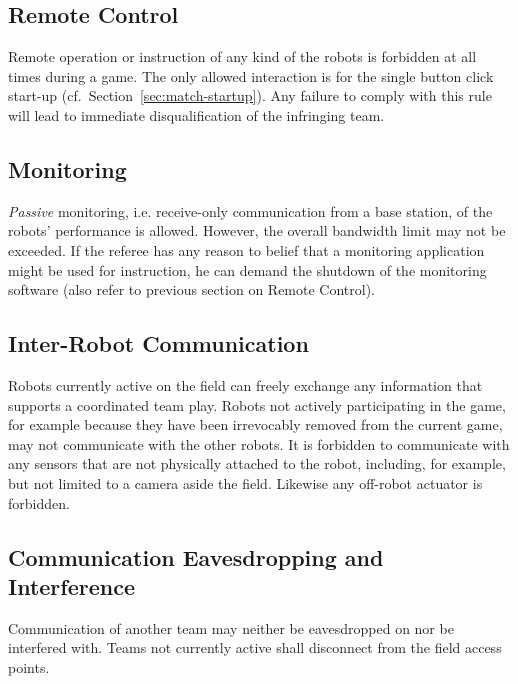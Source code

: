 \documentclass[12pt,twoside]{article}
\newcommand{\refsec}[1]{Section~\ref{#1}}
\begin{document}
\subsection{Remote Control}
\label{sec:remote-control}
Remote operation or instruction of any kind of the robots is forbidden
at all times during a game. The only allowed interaction is for the
single button click start-up (cf.~\refsec{sec:match-startup}). Any
failure to comply with this rule will lead to immediate
disqualification of the infringing team.

\subsection{Monitoring}
\label{sec:monitoring}
\emph{Passive} monitoring, i.e. receive-only communication from a base
station, of the robots' performance is allowed. However, the overall
bandwidth limit may not be exceeded.
If the referee has any reason to belief that a monitoring application
might be used for instruction, he can demand the shutdown of the
monitoring software (also refer to previous section on Remote
Control).

\subsection{Inter-Robot Communication}
\label{sec:inter-robot-comm}
Robots currently active on the field can freely exchange any
information that supports a coordinated team play. Robots not actively
participating in the game, for example because they have been
irrevocably removed from the current game, may not communicate with
the other robots. It is forbidden to communicate with any sensors that
are not physically attached to the robot, including, for example, but
not limited to a camera aside the field. Likewise any off-robot
actuator is forbidden.

\subsection{Communication Eavesdropping and Interference}
\label{sec:comm-tampering}
Communication of another team may neither be eavesdropped on nor be
interfered with. Teams not currently active shall disconnect from the
field access points.
\end{document}

